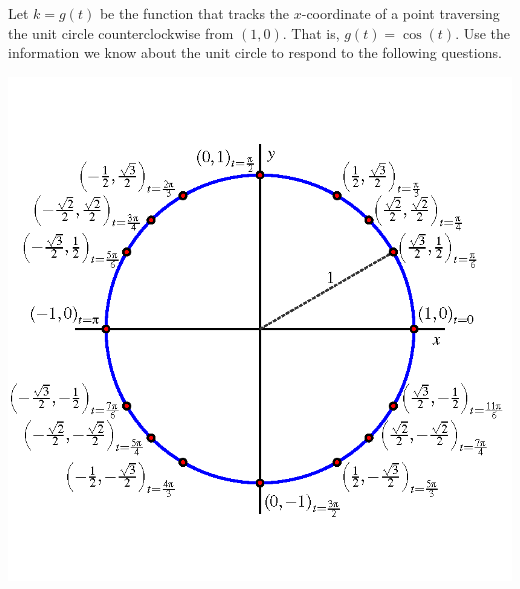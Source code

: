 \documentclass[nooutcomes]{ximera}
\begin{document}
\begin{exploration}
Let \(k = g(t)\) be the function that tracks the \(x\)-coordinate of a point traversing the unit circle counterclockwise from \((1,0)\).  That is, \(g(t) = \cos(t)\).  Use the information we know about the unit circle to respond to the following questions.

\begin{image}
\includegraphics{unit-circle-16-all-labeled.png}
\end{image}


\end{exploration}
\end{document}
